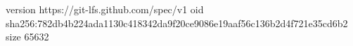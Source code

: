 version https://git-lfs.github.com/spec/v1
oid sha256:782db4b224ada1130c418342da9f20ce9086e19aaf56c136b2d4f721e35cd6b2
size 65632
